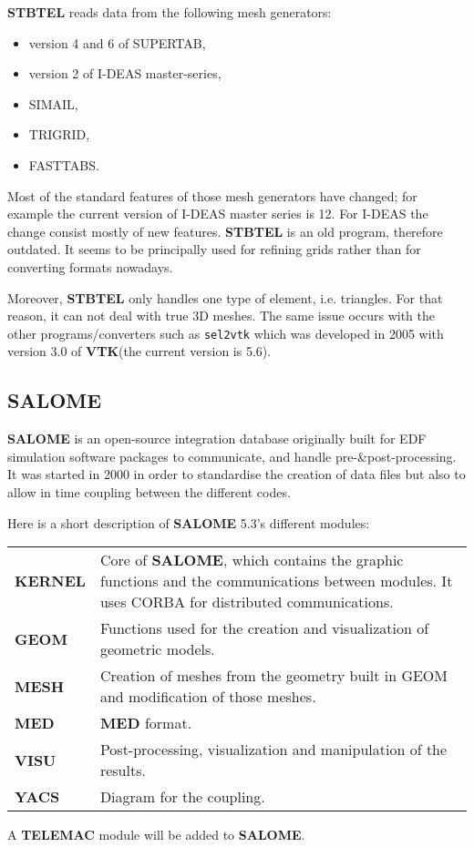 \documentclass[a4paper,10pt]{article}
\newcommand{\tel}{\textbf{TELEMAC}\xspace}
\newcommand{\stb}{\textbf{STBTEL}\xspace}
\newcommand{\sal}{\textbf{SALOME}\xspace}
\newcommand{\med}{\textbf{MED}\xspace}
\newcommand{\vtk}{\textbf{VTK}\xspace}
\begin{document}
\stb reads data from the following mesh generators:

\begin{itemize}
\setlength{\itemsep}{1pt}
\setlength{\parskip}{0pt}
\setlength{\parsep}{0pt}
\item version 4 and 6 of SUPERTAB,
\item version 2 of I-DEAS master-series,
\item SIMAIL,
\item TRIGRID,
\item FASTTABS.
\end{itemize}

Most of the standard features of those mesh generators have changed; for example the current version of I-DEAS master series is 12. For I-DEAS the change consist mostly of new features.
\stb is an old program, therefore outdated. It seems to be principally used for refining grids rather than for converting formats nowadays. 

Moreover, \stb only handles one type of element, i.e. triangles. For that reason, it can not deal with true 3D meshes.
The same issue occurs with the other programs/converters such as \verb+sel2vtk+ which was developed in 2005 
with version 3.0 of \vtk (the current version is 5.6).

\subsection{\sal\cite{salome}}
\sal is an open-source integration database originally built for EDF simulation software packages to communicate, and handle pre-\&post-processing. It was started in 
2000 in order to standardise the creation of data files but also to allow in time coupling 
between the different codes.

Here is a short description of \sal 5.3's different modules:\\

\begin{tabular}{p{70pt}@{ : }p{250pt}}
  \textbf{KERNEL} & Core of \sal, which contains the graphic functions and
the communications between modules. It uses CORBA for distributed communications.\\
  \textbf{GEOM} & Functions used for the creation and visualization of geometric models.\\
  \textbf{MESH} & Creation of meshes from the geometry built in GEOM and modification of those meshes.\\
  \textbf{MED} & \med format.\\
  \textbf{VISU} & Post-processing, visualization and manipulation of the results.\\
  \textbf{YACS} & Diagram for the coupling.\\
\end{tabular}
A \tel module will be added to \sal.
\end{document}
